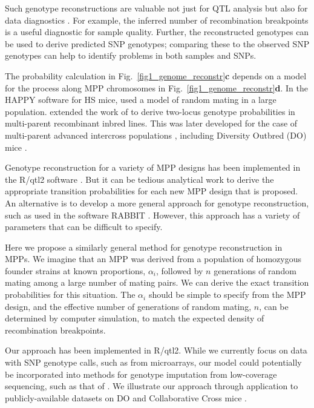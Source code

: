 \documentclass[12pt,letterpaper]{article}\usepackage[]{graphicx}\usepackage[table]{xcolor}
\begin{document}
Such genotype reconstructions are valuable not just for QTL analysis
but also for data diagnostics \citep{broman2019}. For example, the
inferred number of recombination breakpoints is a useful diagnostic
for sample quality. Further, the reconstructed genotypes can be used
to derive predicted SNP genotypes; comparing these to the observed SNP
genotypes can help to identify problems in both samples and SNPs.

The probability calculation in Fig.~\ref{fig1_genome_reconstr}\textbf{c}
depends on a model for the process along MPP chromosomes in
Fig.~\ref{fig1_genome_reconstr}\textbf{d}. In the HAPPY software for
HS mice, \citet{mott2000}
used a model of random mating in a large population.
\citet{broman2005} extended the work of \citet{haldane1931}
to derive two-locus genotype probabilities in multi-parent
recombinant inbred lines. This was later developed
for the case of multi-parent advanced intercross populations
\citep{broman2012a,broman2012b}, including Diversity
Outbred (DO) mice \citep{churchill2012}.

Genotype reconstruction for a variety of MPP designs has been
implemented in the R/qtl2 software
\citep[][\url{https://kbroman.org/qtl2}]{rqtl2}. But it can be tedious
analytical work to derive the appropriate transition probabilities
for each new MPP design that is proposed. An alternative is to develop a
more general approach for genotype reconstruction, such as used in the
software RABBIT \citep{zheng2015}. However, this approach has a
variety of parameters that can be difficult to specify.

Here we propose a similarly general method for genotype reconstruction
in MPPs. We imagine that an MPP was derived from a population of
homozygous founder strains at known proportions, $\alpha_i$, followed
by $n$ generations of random mating among a large number of
mating pairs. We can derive the exact transition probabilities for
this situation. The $\alpha_i$ should be simple to specify from the MPP
design, and the effective number of generations of random mating, $n$,
can be determined by computer simulation, to match the expected density of
recombination breakpoints.

Our approach has been implemented in R/qtl2. While we currently focus
on data with SNP genotype calls, such as from microarrays, our model
could potentially be incorporated into methods for genotype imputation
from low-coverage sequencing, such as that of \citet{zheng2018}. We
illustrate our approach through application to publicly-available
datasets on DO \citep{albarghouthi2021} and Collaborative Cross mice
\citep{srivastava2017}.
\end{document}
